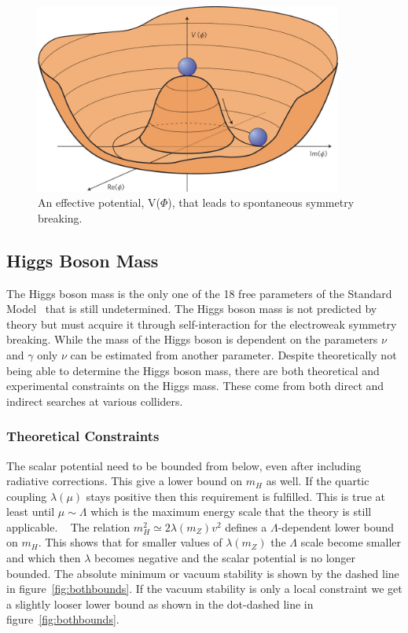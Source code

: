 \begin{figure}[htb]
\centering
\includegraphics[width=0.9\textwidth]{StandardModel/higgs_potential.jpg}
\caption{\small An effective potential, V($\Phi$), that leads to spontaneous symmetry breaking.~\cite{Eyeonaprize2011} }
\label{fig:higgs_potential}
\end{figure}



\subsection{Higgs Boson Mass}

The Higgs boson mass is the only one of the 18 free parameters of the Standard Model~\cite{Englert1964} that is still undetermined.  The Higgs boson mass is not predicted by theory but must acquire it through self-interaction for the electroweak symmetry breaking.  While the mass of the Higgs boson is dependent on the parameters $\nu$ and $\gamma$ only $\nu$ can be estimated from another parameter.  Despite theoretically not being able to determine the Higgs boson mass, there are both theoretical and experimental constraints on the Higgs mass.  These come from both direct and indirect searches at various colliders.


\subsubsection{Theoretical Constraints}


The scalar potential need to be bounded from below, even after including radiative corrections.  This give a lower bound on $m_H$ as well.  If the quartic coupling $\lambda(\mu)$ stays positive then this requirement is fulfilled.  This is true at least until $\mu\sim\Lambda$ which is the maximum energy scale that the theory is still applicable.  ~\cite{Ridolfi2001} The relation $m_H^2\simeq 2\lambda(m_Z)v^2$ defines a $\Lambda$-dependent lower bound on $m_H$.  This shows that for smaller values of $\lambda(m_Z)$ the $\Lambda$ scale become smaller and which then $\lambda$ becomes negative and the scalar potential is no longer bounded.  The absolute minimum or vacuum stability is shown by the dashed line in figure~\ref{fig:bothbounds}. If the vacuum stability is only a local constraint we get a slightly looser lower bound as shown in the dot-dashed line in figure~\ref{fig:bothbounds}.


